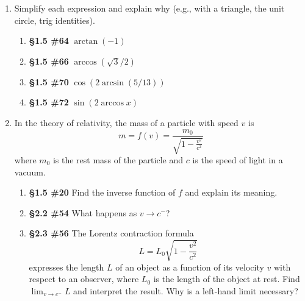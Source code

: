 \documentclass[%
]{article}
\begin{document}
\begin{enumerate}
\item Simplify each expression and explain why (e.g., with a triangle, the unit circle, trig identities).
	\begin{enumerate}
	\item {\bf \S1.5 \#64} $\arctan(-1)$
	\item {\bf \S1.5 \#66} $\arccos(\sqrt 3/2)$
	\item {\bf \S1.5 \#70} $\cos(2\arcsin(5/13))$
	\item {\bf \S1.5 \#72} $\sin(2\arccos x)$
	\end{enumerate}

\item In the theory of relativity, the mass of a particle with speed $v$ is 
\[
m=f(v)=\frac{m_0}{\sqrt{1-\frac{v^2}{c^2}}}
\] 
where $m_0$ is the rest mass of the particle and $c$ is the speed of light in a vacuum.  
	\begin{enumerate}
	\item {\bf \S1.5 \#20} Find the inverse function of $f$ and explain its meaning.
	\item {\bf \S2.2 \#54} What happens as $v\to c^-$?
	\item {\bf \S2.3 \#56} The Lorentz contraction formula 
	\[
	L=L_0\sqrt{1-\frac{v^2}{c^2}}
	\]
	expresses the length $L$ of an object as a function of its velocity $v$ with respect to an observer, where $L_0$ is the length of the object at rest.  Find $\lim_{v\to c^-}L$ and interpret the result.  Why is a left-hand limit necessary?
	\end{enumerate}



	

\end{enumerate}
\end{document}
